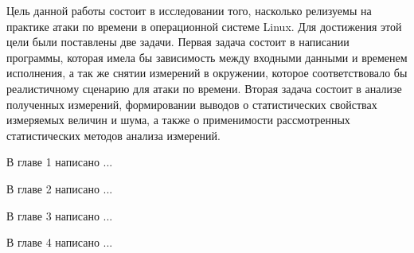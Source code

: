 Цель данной работы состоит в исследовании того, насколько релизуемы на практике
атаки по времени в операционной системе Linux. Для достижения этой цели были
поставлены две задачи. Первая задача состоит в написании программы, которая
имела бы зависимость между входными данными и временем исполнения, а так же
снятии измерений в окружении, которое соответствовало бы реалистичному сценарию
для атаки по времени. Вторая задача состоит в анализе полученных измерений,
формировании выводов о статистических свойствах измеряемых величин и шума, а также
о применимости рассмотренных статистических методов анализа измерений.


В главе 1 написано ...

В главе 2 написано ...

В главе 3 написано ...

В главе 4 написано ...

\clearpage
